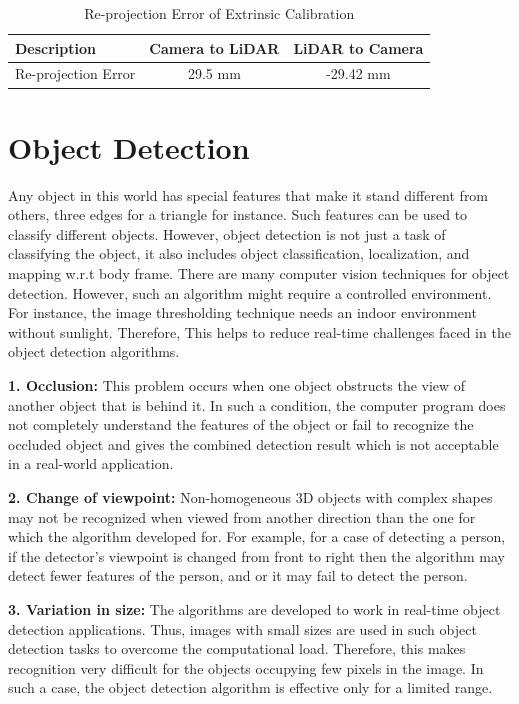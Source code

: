 \begin{table}
    \centering
    \begin{tabular}{|l|c|c|}
        \hline
        Description & Camera to LiDAR & LiDAR to Camera \\
        \hline
        Re-projection Error & 29.5 mm & -29.42 mm \\
        \hline
    \end{tabular}
    \caption{Re-projection Error of Extrinsic Calibration}
    \label{Extrinsics}
\end{table}

\section{Object Detection}
Any object in this world has special features that make it stand different from others, three edges for a triangle for instance. Such features can be used to classify different objects. However, object detection is not just a task of classifying the object, it also includes object classification, localization, and mapping w.r.t body frame. There are many computer vision techniques for object detection. However, such an algorithm might require a controlled environment. For instance, the image thresholding technique needs an indoor environment without sunlight. Therefore, This helps to reduce real-time challenges faced in the object detection algorithms.

\textbf{1. Occlusion:}
This problem occurs when one object obstructs the view of another object that is behind it. In such a condition, the computer program does not completely understand the features of the object or fail to recognize the occluded object and gives the combined detection result which is not acceptable in a real-world application. 

\textbf{2. Change of viewpoint:}
Non-homogeneous 3D objects with complex shapes may not be recognized when viewed from another direction than the one for which the algorithm developed for. For example, for a case of detecting a person, if the detector's viewpoint is changed from front to right then the algorithm may detect fewer features of the person, and or it may fail to detect the person. 

\textbf{3. Variation in size:}
The algorithms are developed to work in real-time object detection applications. Thus, images with small sizes are used in such object detection tasks to overcome the computational load. Therefore, this makes recognition very difficult for the objects occupying few pixels in the image. In such a case, the object detection algorithm is effective only for a limited range.  

